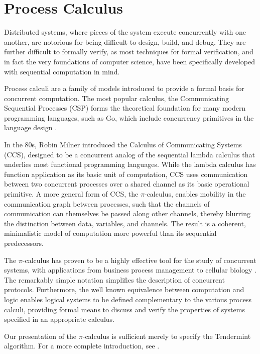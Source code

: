 \section{Process Calculus}

Distributed systems, where pieces of the system execute concurrently with one another,
are notorious for being difficult to design, build, and debug.
They are further difficult to formally verify, 
as most techniques for formal verification, and in fact the very foundations of computer science,
have been specifically developed with sequential computation in mind.

Process calculi are a family of models introduced 
to provide a formal basis for concurrent computation.
The most popular calculus, the Communicating Sequential Processes (CSP) \cite{csp}
forms the theoretical foundation for many modern programming languages,
such as Go, which include concurrency primitives in the language design \cite{csp_go}.

In the 80s, Robin Milner introduced the Calculus of Communicating Systems (CCS), 
designed to be a concurrent analog of the sequential lambda calculus that underlies most functional programming languages.
While the lambda calculus has function application as its basic unit of computation,
CCS uses communication between two concurrent processes over a shared channel as its basic operational primitive.
A more general form of CCS, the $\pi$-calculus, 
enables mobility in the communication graph between processes, 
such that the channels of communication can themselves be passed along other channels,
thereby blurring the distinction between data, variables, and channels.
The result is a coherent, minimalistic model of computation more powerful than its sequential predecessors.

The $\pi$-calculus has proven to be a highly effective tool for the study of concurrent systems,
with applications from business process management \cite{lucchi2007pi} to cellular biology \cite{phillips2007efficient}.
The remarkably simple notation simplifies the description of concurrent protocols.
Furthermore, the well known equivalence between computation and logic \cite{abramsky1994proofs} enables
logical systems to be defined complementary to the various process calculi,
providing formal means to discuss and verify the properties of systems specified in an appropriate calculus.

Our presentation of the $\pi$-calculus is sufficient merely to specify the Tendermint algorithm.
For a more complete introduction, see \cite{milner1992calculus}.

